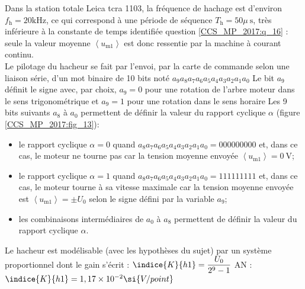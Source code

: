 Dans la station totale Leica tcra 1103, la fréquence de hachage est d'environ $f_{\mathrm{h}}=20 \mathrm{kHz}$, ce qui correspond à une période de séquence $T_{\mathrm{h}}=50 \mu \mathrm{~s}$, très inférieure à la constante de temps identifiée question \ref{CCS_MP_2017:q_16}  : seule la valeur moyenne $\left\langle u_{\mathrm{m} 1}\right\rangle$ est donc ressentie par la machine à courant continu.\\
Le pilotage du hacheur se fait par l'envoi, par la carte de commande selon une liaison série, d'un mot binaire de 10 bits noté $a_{9} a_{8} a_{7} a_{6} a_{5} a_{4} a_{3} a_{2} a_{1} a_{0}$ Le bit $a_{9}$ définit le signe avec, par choix, $a_{9}=0$ pour une rotation de l'arbre moteur dans le sens trigonométrique et $a_{9}=1$ pour une rotation dans le sens horaire Les 9 bits suivants $a_{8}$ à $a_{0}$ permettent de définir la valeur du rapport cyclique $\alpha$ (figure \ref{CCS_MP_2017:fig_13}):
\begin{itemize}
  \item le rapport cyclique $\alpha=0$ quand $a_{8} a_{7} a_{6} a_{5} a_{4} a_{3} a_{2} a_{1} a_{0}=000000000$ et, dans ce cas, le moteur ne tourne pas car la tension moyenne envoyée $\left\langle u_{\mathrm{m} 1}\right\rangle=0 \mathrm{~V}$;
  \item le rapport cyclique $\alpha=1$ quand $a_{8} a_{7} a_{6} a_{5} a_{4} a_{3} a_{2} a_{1} a_{0}=111111111$ et, dans ce cas, le moteur tourne à sa vitesse maximale car la tension moyenne envoyée est $\left\langle u_{\mathrm{m} 1}\right\rangle= \pm U_{0}$ selon le signe défini par la variable $a_{9}$;
  \item les combinaisons intermédiaires de $a_{0}$ à $a_{8}$ permettent de définir la valeur du rapport cyclique $\alpha$.
\end{itemize}
\fi

\ifprof
\begin{corrige}
Le hacheur est modélisable (avec les hypothèses du sujet) par un système proportionnel dont le gain s’écrit : 
$\indice{K}{h1} = \dfrac{U_0}{2^9-1}$
 AN : $\indice{K}{h1} =1,17 \times 10^{-2}\si{V/point}$
\end{corrige}
\else
\fi



